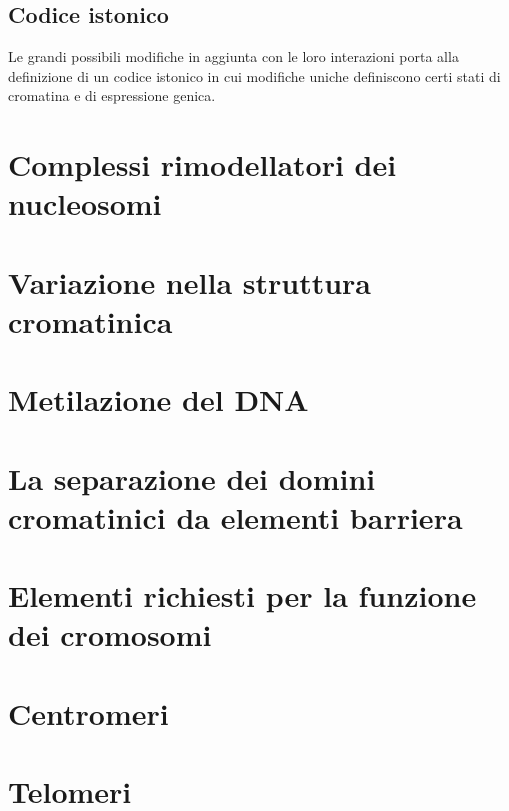 \subsection{Codice istonico}
Le grandi possibili modifiche in aggiunta con le loro interazioni porta alla definizione di un codice istonico in cui modifiche uniche definiscono certi stati di cromatina e di 
espressione genica. 
\section{Complessi rimodellatori dei nucleosomi}

\section{Variazione nella struttura cromatinica}

\section{Metilazione del DNA}

\section{La separazione dei domini cromatinici da elementi barriera}

\section{Elementi richiesti per la funzione dei cromosomi}

\section{Centromeri}

\section{Telomeri}
